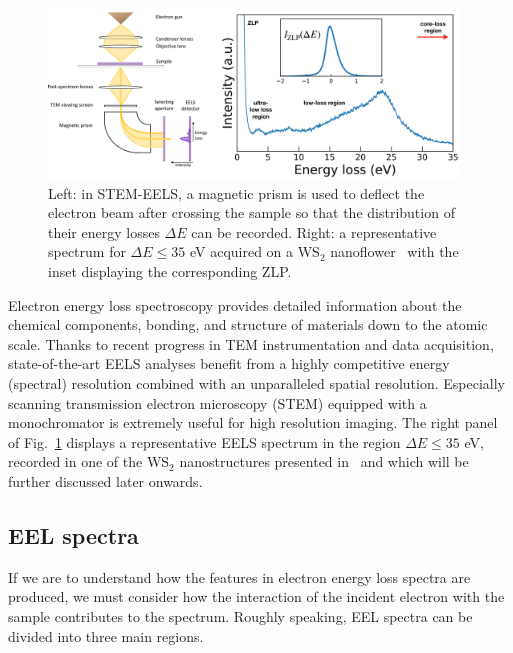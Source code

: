 \begin{figure}[H]
    \centering
    \includegraphics[width=0.97\textwidth]{plots/EELS.pdf}
    \caption{Left: in STEM-EELS, a magnetic
      prism is used to deflect the electron beam after crossing the sample
      so that the distribution of their energy losses $\Delta E$ can be recorded.
      Right: a representative spectrum for $\Delta E \le 35$ eV acquired 
      on a WS$_2$ nanoflower~\cite{SabryaWS2} with
      the inset displaying the corresponding ZLP.
      }
    \label{fig:EELS}
\end{figure}

Electron energy loss spectroscopy  provides detailed information about the 
chemical components, bonding, and structure of materials down to the atomic scale.
%
Thanks to recent progress in TEM instrumentation and data acquisition, state-of-the-art 
EELS analyses benefit from
a highly competitive energy (spectral) resolution combined with an unparalleled spatial resolution.
%
Especially scanning transmission electron microscopy (STEM) equipped with a monochromator 
is extremely useful for high resolution imaging.
The right panel of Fig.~\ref{fig:EELS} displays
a representative EELS spectrum in the region $\Delta E \le 35$ eV, recorded
in one of the WS$_2$ nanostructures presented in~\cite{SabryaWS2}
and which will be further discussed later onwards.

\subsection{EEL spectra}
If we are to understand how the features in electron energy loss spectra are produced, 
we must consider how the interaction of the incident electron with the sample 
contributes to the spectrum. 
%
Roughly speaking, EEL spectra can be divided into three main regions.\\


